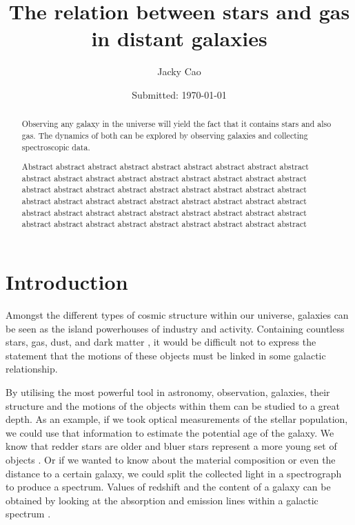 \documentclass[12pt, twocolumn]{revtex4}    %
\begin{document}
                     


\title{The relation between stars and gas in distant galaxies} 
\date{Submitted: \today{}}
\author{Jacky Cao}

\begin{abstract}              
 
 Observing any galaxy in the universe will yield the fact that it contains stars and also gas. The dynamics of both can be explored by observing galaxies and collecting spectroscopic data. 
 
Abstract abstract abstract abstract abstract abstract abstract abstract abstract abstract abstract abstract abstract abstract abstract abstract abstract abstract abstract abstract abstract abstract abstract abstract abstract abstract abstract abstract abstract abstract abstract abstract abstract abstract abstract abstract abstract abstract abstract abstract abstract abstract abstract abstract abstract abstract abstract abstract abstract abstract abstract abstract abstract abstract 

\end{abstract}


\maketitle

\tableofcontents

\newpage

\section{Introduction} 

Amongst the different types of cosmic structure within our universe, galaxies can be seen as the island powerhouses of industry and activity. Containing countless stars, gas, dust, and dark matter \cite{carroll_astro}, it would be difficult not to express the statement that the motions of these objects must be linked in some galactic relationship. 

By utilising the most powerful tool in astronomy, observation, galaxies, their structure and the motions of the objects within them can be studied to a great depth. As an example, if we took optical measurements of the stellar population, we could use that information to estimate the potential age of the galaxy. We know that redder stars are older and bluer stars represent a more young set of objects \cite{carroll_astro}. Or if we wanted to know about the material composition or even the distance to a certain galaxy, we could split the collected light in a spectrograph to produce a spectrum. Values of redshift and the content of a galaxy can be obtained by looking at the absorption and emission lines within a galactic spectrum \cite{carroll_astro}.
\end{document}
